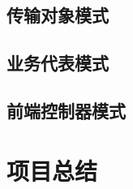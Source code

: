 \documentclass[cn,black,12pt,normal]{elegantnote}
\begin{document}
\subsection{传输对象模式}

\subsection{业务代表模式}

\subsection{前端控制器模式}

\section{项目总结}






\end{document}
